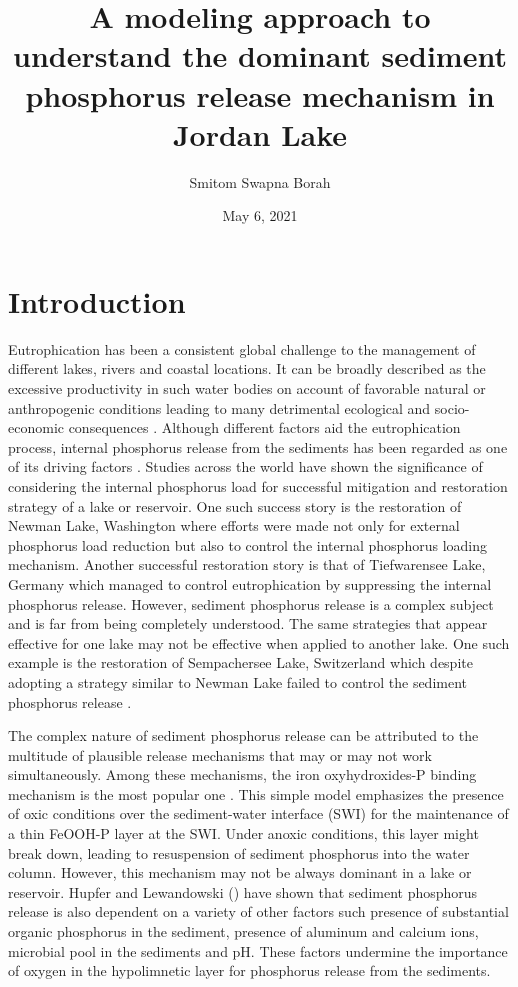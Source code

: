 \documentclass[fleqn]{article}
\title{A modeling approach to understand the dominant sediment phosphorus release mechanism in Jordan Lake}
\author{Smitom Swapna Borah}
\date{May 6, 2021}
\begin{document}
\maketitle


\section{Introduction}
Eutrophication has been a consistent global challenge to the management of different lakes, rivers and coastal locations. It can be broadly described as the excessive productivity in such water bodies on account of favorable natural or anthropogenic conditions leading to many detrimental ecological and socio-economic consequences \parencite{LeMoal2019}. Although different factors aid the eutrophication process, internal phosphorus release from the sediments has been regarded as one of its driving factors \parencite{Nurnberg2009}. Studies across the world have shown the significance of considering the internal phosphorus load for successful mitigation and restoration strategy of a lake or reservoir. One such success story is the restoration of Newman Lake, Washington where efforts were made not only for external phosphorus load reduction but also to control the internal phosphorus loading mechanism. Another successful restoration story is that of Tiefwarensee Lake, Germany which managed to control eutrophication by suppressing the internal phosphorus release. However, sediment phosphorus release is a complex subject and is far from being completely understood. The same strategies that appear effective for one lake may not be effective when applied to another lake. One such example is the restoration of Sempachersee Lake, Switzerland which despite adopting a strategy similar to Newman Lake failed to control the sediment phosphorus release \parencite{Nurnberg2009}.  

The complex nature of sediment phosphorus release can be attributed to the multitude of plausible release mechanisms that may or may not work simultaneously. Among these mechanisms, the iron oxyhydroxides-P binding mechanism is the most popular one \parencite{mortimer1942}. This simple model emphasizes the presence of oxic conditions over the sediment-water interface (SWI) for the maintenance of a thin FeOOH-P layer at the SWI. Under anoxic conditions, this layer might break down, leading to resuspension of sediment phosphorus into the water column. However, this mechanism may not be always dominant in a lake or reservoir. Hupfer and Lewandowski (\cite*{Hupfer2008}) have shown that sediment phosphorus release is also dependent on a variety of other factors such presence of substantial organic phosphorus in the sediment, presence of aluminum and calcium ions, microbial pool in the sediments and pH. These factors undermine the importance of oxygen in the hypolimnetic layer for phosphorus release from the sediments.
\end{document}
